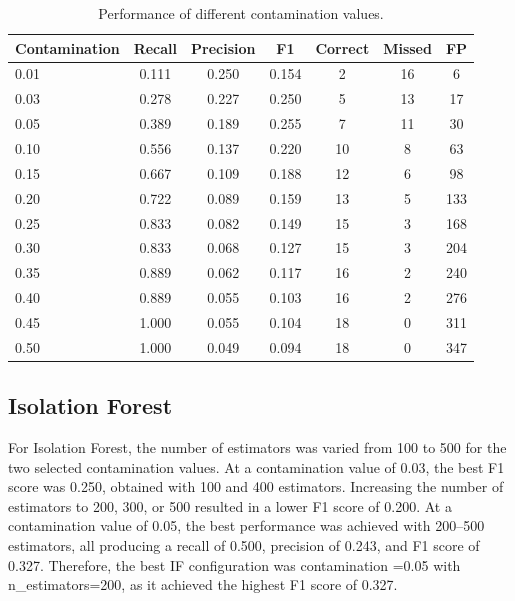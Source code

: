 \documentclass[a4paper,12pt]{article}
\begin{document}
\begin{table}
	\centering
	\small
	\setlength{\tabcolsep}{5pt}
	\caption{Performance of different contamination values.}
	\label{tab:contamination}
	\begin{tabular}{lcccccc}
		\hline
		Contamination & Recall & Precision & F1 & Correct & Missed & FP \\
		\hline
		0.01 & 0.111 & 0.250 & 0.154 & 2 & 16 & 6 \\
		0.03 & 0.278 & 0.227 & 0.250 & 5 & 13 & 17 \\
		0.05 & 0.389 & 0.189 & 0.255 & 7 & 11 & 30 \\
		0.10 & 0.556 & 0.137 & 0.220 & 10 & 8 & 63 \\
		0.15 & 0.667 & 0.109 & 0.188 & 12 & 6 & 98 \\
		0.20 & 0.722 & 0.089 & 0.159 & 13 & 5 & 133 \\
		0.25 & 0.833 & 0.082 & 0.149 & 15 & 3 & 168 \\
		0.30 & 0.833 & 0.068 & 0.127 & 15 & 3 & 204 \\
		0.35 & 0.889 & 0.062 & 0.117 & 16 & 2 & 240 \\
		0.40 & 0.889 & 0.055 & 0.103 & 16 & 2 & 276 \\
		0.45 & 1.000 & 0.055 & 0.104 & 18 & 0 & 311 \\
		0.50 & 1.000 & 0.049 & 0.094 & 18 & 0 & 347 \\
		\hline
	\end{tabular}
\end{table}

\subsection{Isolation Forest}

For Isolation Forest, the number of estimators was varied from 100 to 500 for the two selected contamination values. At a contamination value of 0.03, the best F1 score was 0.250, obtained with 100 and 400 estimators. Increasing the number of estimators to 200, 300, or 500 resulted in a lower F1 score of 0.200. At a contamination value of 0.05, the best performance was achieved with 200--500 estimators, all producing a recall of 0.500, precision of 0.243, and F1 score of 0.327. Therefore, the best IF configuration was contamination =0.05 with n\_estimators=200, as it achieved the highest F1 score of 0.327.
\end{document}
